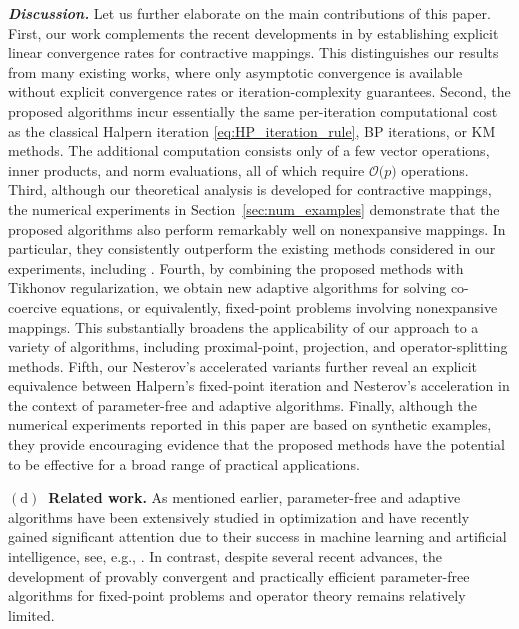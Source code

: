 \documentclass{article}
\theoremstyle{plain}
\theoremstyle{definition}
\newcommand{\0}{\boldsymbol{0}}
\newcommand{\BigOs}[1]{\mathcal{O}\big(#1\big)}
\begin{document}
\textbf{\textit{Discussion.}}
Let us further elaborate on the main contributions of this paper. 
First, our work complements the recent developments in \cite{diakonikolas2020halpern,he2024convergence} by establishing explicit linear convergence rates for contractive mappings. 
This distinguishes our results from many existing works, where only asymptotic convergence is available without explicit convergence rates or iteration-complexity guarantees.
Second, the proposed algorithms incur essentially the same per-iteration computational cost as the classical Halpern iteration \eqref{eq:HP_iteration_rule}, BP iterations, or KM methods. 
The additional computation consists only of a few vector operations, inner products, and norm evaluations, all of which require $\BigOs{p}$ operations.
Third, although our theoretical analysis is developed for contractive mappings, the numerical experiments in Section~\ref{sec:num_examples} demonstrate that the proposed algorithms also perform remarkably well on nonexpansive mappings. 
In particular, they consistently outperform the existing methods considered in our experiments, including \cite{he2024convergence}.
Fourth, by combining the proposed methods with Tikhonov regularization, we obtain new adaptive algorithms for solving co-coercive equations, or equivalently, fixed-point problems involving nonexpansive mappings. 
This substantially broadens the applicability of our approach to a variety of algorithms, including proximal-point, projection, and operator-splitting methods.
Fifth, our Nesterov's accelerated variants further reveal an explicit equivalence between Halpern's fixed-point iteration and Nesterov's acceleration in the context of parameter-free and adaptive algorithms.
Finally, although the numerical experiments reported in this paper are based on synthetic examples, they provide encouraging evidence that the proposed methods have the potential to be effective for a broad range of practical applications.

\vspace{0.75ex}
\noindent\textbf{$\mathrm{(d)}$~Related work.}
As mentioned earlier, parameter-free and adaptive algorithms have been extensively studied in optimization and have recently gained significant attention due to their success in machine learning and artificial intelligence, see, e.g., \cite{defazio2022parameter,defazio2023learning,Duchi2011,KingmaB14,jordan2024muon,orabona2016coin}. 
In contrast, despite several recent advances, the development of provably convergent and practically efficient parameter-free algorithms for fixed-point problems and operator theory remains relatively limited.
\end{document}
